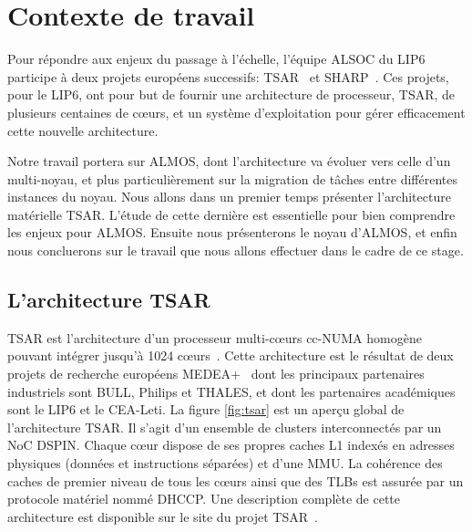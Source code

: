 \chapter{Contexte de travail}
\label{sec:context}

  Pour répondre aux enjeux du passage à l'échelle, l'équipe
  ALSOC du
  LIP6 participe à deux projets européens successifs: TSAR~\cite{tsar2008} et
  SHARP~\cite{sharp2012}. Ces projets, pour le LIP6, ont pour but de fournir une
  architecture de processeur, TSAR, de plusieurs centaines de c\oe urs, et un
  système d'exploitation pour gérer efficacement cette nouvelle architecture.

  Notre travail portera sur ALMOS, dont l'architecture va évoluer vers celle
  d'un multi-noyau, et plus particulièrement sur la migration de tâches entre
  différentes instances du noyau. Nous allons dans un premier temps présenter
  l'architecture matérielle TSAR. L'étude de cette dernière est essentielle pour
  bien comprendre les enjeux pour ALMOS. Ensuite nous présenterons le noyau
  d'ALMOS, et enfin nous concluerons sur le travail que nous allons effectuer
  dans le cadre de ce stage.
  

  \section{L'architecture TSAR}
  \label{sec:tsar}

    TSAR est l'architecture d’un processeur multi-c\oe urs cc-NUMA homogène
    pouvant intégrer jusqu’à 1024 c\oe urs~\cite{greiner2009tsar}. Cette
    architecture est le résultat de deux projets de recherche européens
    MEDEA+~\cite{tsar2008,sharp2012} dont les principaux partenaires industriels
    sont BULL, Philips et THALES, et dont les partenaires académiques sont le
    LIP6 et le CEA-Leti. La figure \ref{fig:tsar} est un aperçu global de
    l'architecture TSAR. Il s'agit d'un ensemble de clusters interconnectés par
    un NoC
    DSPIN. Chaque c\oe ur dispose de ses propres caches L1 indexés en
    adresses physiques (données et instructions séparées) et d'une MMU. La
    cohérence des caches de premier niveau de tous les c\oe urs ainsi que des
    TLBs est assurée par un
    protocole matériel nommé DHCCP. Une description complète de cette architecture est
    disponible sur le site du projet TSAR~\cite{tsar2008web}.

